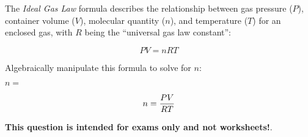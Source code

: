

The {\it Ideal Gas Law} formula describes the relationship between gas pressure ($P$), container volume ($V$), molecular quantity ($n$), and temperature ($T$) for an enclosed gas, with $R$ being the ``universal gas law constant'':

$$PV = nRT$$

Algebraically manipulate this formula to solve for $n$:

\vskip 20pt

$n = $







$$n = {PV \over RT}$$







{\bf This question is intended for exams only and not worksheets!}.



